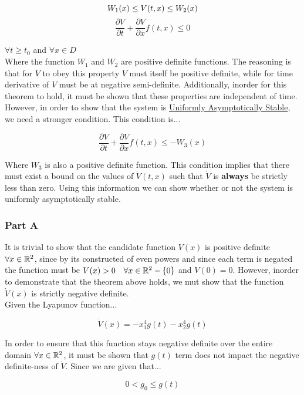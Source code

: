 $$
  W_1(x)\leq V(t,x) \leq W_2(x) \\
$$
$$
\frac{\partial V}{\partial t} + \frac{\partial V}{\partial x}f(t,x) \leq 0
$$

\noindent $\forall t \geq t_0$ and $\forall x \in D$\\

\noindent Where the function $W_1$ and $W_2$ are positive definite functions. The reasoning is that for $V$ to obey this property $V$ must itself be positive definite, while for time derivative of $V$ must be at negative semi-definite. Additionally, inorder for this theorem to hold, it must be shown that these properties are independent of time. \\

\noindent However, in order to show that the system is \underline{Uniformly Asymptotically Stable}, we need a stronger condition. This condition is...

$$
\frac{\partial V}{\partial t} + \frac{\partial V}{\partial x}f(t,x) \leq - W_3(x)
$$

\noindent Where $W_3$ is also a positive definite function. This condition implies that there must exist a bound on the values of $\dot{V}(t,x)$ such that $\dot{V}$ is \textbf{always} be strictly less than zero. Using this information we can show whether or not the system is uniformly asymptotically stable.


\subsubsection*{Part A}
It is trivial to show that the candidate function $V(x)$ is positive definite $\forall x \in \mathbb{R}^2$, since by its constructed of even powers and since each term is negated the function must be $V(x) > 0 \quad \forall x \in \mathbb{R}^2 - \{0\}$ and $V(0)=0$. However, inorder to demonstrate that the theorem above holds, we mut show that the function $\dot{V}(x)$ is strictly negative definite. \\

\noindent Given the Lyapunov function...

$$
\dot{V}(x) = - x_1^4g(t) -x_2^4g(t)
$$

\noindent In order to ensure that this function stays negative definite over the entire domain $\forall x \in \mathbb{R}^2$, it must be shown that $g(t)$ term does not impact the negative definite-ness of $\dot{V}$. Since we are given that...

$$ 0<g_{0} \leq g(t)$$

